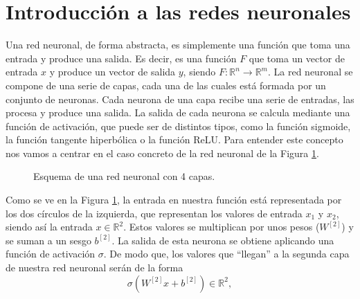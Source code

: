 \documentclass[a4paper,11pt,spanish, twoside, leqno]{tfg-uam}
\theoremstyle{definition}
\begin{document}
\section{Introducción a las redes neuronales}\label{sec:RedesNeuronales}
Una red neuronal, de forma abstracta, es simplemente una función que toma una entrada y produce una salida. Es decir, es una función $F$ que toma un vector de entrada $x$ y produce un vector de salida $y$, siendo $F: \mathbb{R}^n \rightarrow \mathbb{R}^m$. La red neuronal se compone de una serie de capas, cada una de las cuales está formada por un conjunto de neuronas. Cada neurona de una capa recibe una serie de entradas, las procesa y produce una salida. La salida de cada neurona se calcula mediante una función de activación, que puede ser de distintos tipos, como la función sigmoide, la función tangente hiperbólica o la función ReLU. Para entender este concepto nos vamos a centrar en el caso concreto de la red neuronal de la Figura \ref{fig:RedNeuronal}.


\begin{figure}
    \centering
    \caption{Esquema de una red neuronal con 4 capas.}
    \label{fig:RedNeuronal}
\end{figure}

Como se ve en la Figura \ref{fig:RedNeuronal}, la entrada en nuestra función está representada por los dos círculos de la izquierda, que representan los valores de entrada $x_1$ y $x_2$, siendo así la entrada $x\in\mathbb{R}^2$. Estos valores se multiplican por unos pesos ($W^{[2]}$) y se suman a un sesgo $b^{[2]}$. La salida de esta neurona se obtiene aplicando una función de activación $\sigma$. De modo que, los valores que ``llegan'' a la segunda capa de nuestra red neuronal serán de la forma
\begin{equation*}
    \sigma(W^{[2]}x+b^{[2]})\in\mathbb{R}^2,
\end{equation*}
\end{document}
